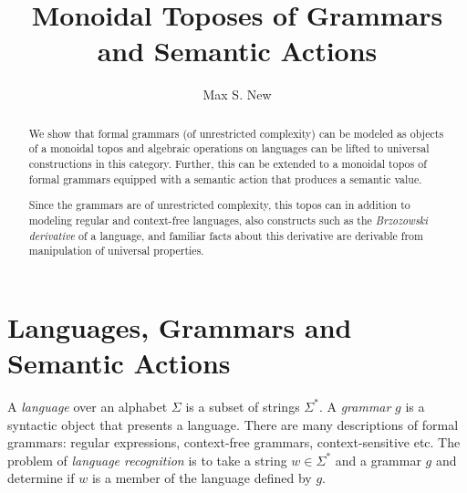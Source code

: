 \documentclass[12pt]{article}
\begin{document}
\title{Monoidal Toposes of Grammars and Semantic Actions}
\author{Max S. New}
\maketitle

\begin{abstract}
  We show that formal grammars (of unrestricted complexity) can be
  modeled as objects of a monoidal topos and algebraic operations on
  languages can be lifted to universal constructions in this
  category. Further, this can be extended to a monoidal topos of
  formal grammars equipped with a semantic action that produces a
  semantic value.

  Since the grammars are of unrestricted complexity, this topos can in
  addition to modeling regular and context-free languages, also
  constructs such as the \emph{Brzozowski derivative} of a language,
  and familiar facts about this derivative are derivable from
  manipulation of universal properties.
\end{abstract}

\section{Languages, Grammars and Semantic Actions}

A \emph{language} over an alphabet $\Sigma$ is a subset of strings
$\Sigma^*$. A \emph{grammar} $g$ is a syntactic object that presents a
language. There are many descriptions of formal grammars: regular
expressions, context-free grammars, context-sensitive etc. The problem
of \emph{language recognition} is to take a string $w \in \Sigma^*$
and a grammar $g$ and determine if $w$ is a member of the language
defined by $g$.
\end{document}
